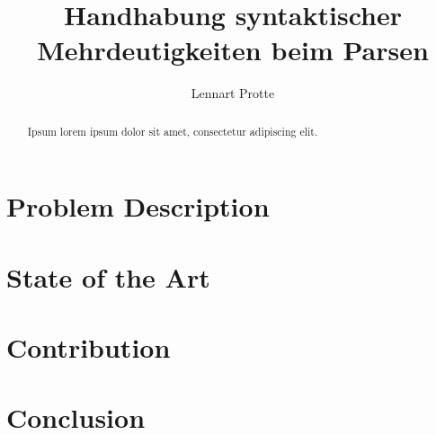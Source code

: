\documentclass[runningheads]{llncs}
\begin{document}
%
\title{Handhabung syntaktischer Mehrdeutigkeiten beim Parsen}
%
%
\author{Lennart Protte}
%
%
%
\maketitle              %
%
\begin{abstract}
Ipsum lorem ipsum dolor sit amet, consectetur adipiscing elit.
\end{abstract}
%
%
%

\section{Problem Description}

\section{State of the Art}

\section{Contribution}

\section{Conclusion}

%
%
%


\end{document}
